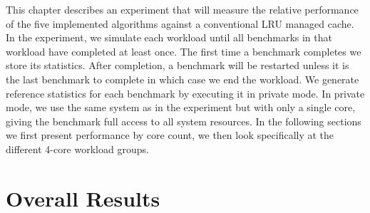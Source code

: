 This chapter describes an experiment that will measure the relative performance of the five implemented algorithms against a conventional LRU managed cache.
In the experiment, we simulate each workload until all benchmarks in that workload have completed at least once. 
The first time a benchmark completes we store its statistics.
After completion, a benchmark will be restarted unless it is the last benchmark to complete in which case we end the workload.
We generate reference statistics for each benchmark by executing it in private mode.
In private mode, we use the same system as in the experiment but with only a single core, giving the benchmark full access to all system resources.
In the following sections we first present performance by core count, we then look specifically at the different 4-core workload groups.

\section{Overall Results}
\label{sec:results:cache_partition}


